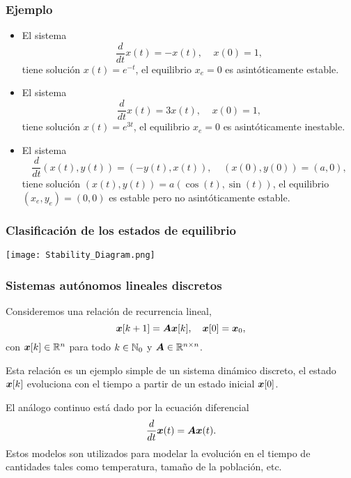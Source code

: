 \documentclass[aspectratio=169,12pt,spanish]{beamer}
\begin{document}

\begin{frame}
\frametitle{Ejemplo}
\begin{itemize}
\item El sistema
$$
\frac{d}{dt}{x(t)}  = -x(t),\;\;\;\;x(0) = 1,
$$
tiene solución $x(t) = e^{-t}$, el equilibrio $x_e = 0$ es asintóticamente estable.

\item El sistema
$$
\frac{d}{dt}{x(t)}  = 3x(t),\;\;\;\;x(0) = 1,
$$
tiene solución $x(t) = e^{3t}$, el equilibrio $x_e = 0$ es asintóticamente inestable.

\item El sistema
$$
\frac{d}{dt}{(x(t), y(t))}  = (-y(t), x(t)),\;\;\;\;(x(0), y(0)) = (a,0),
$$
tiene solución $(x(t), y(t)) = a(\cos(t), \sin(t))$, el equilibrio $(x_e, y_e) = (0,0)$ es estable pero no asintóticamente estable.

\end{itemize}

\end{frame}



\begin{frame}
\frametitle{Clasificación de los estados de equilibrio}

\begin{center}
\texttt{[image: Stability\_Diagram.png]}
\end{center}



\end{frame}




\begin{frame}
\frametitle{Sistemas autónomos lineales discretos}

Consideremos una relación de recurrencia lineal,
$$
\bm{x}[k+1] = \bm{A} \bm{x}[k], \quad \bm{x}[0] = \bm{x}_0,
$$
con $\bm{x}[k] \in \mathbb{R}^n$ para todo $k \in \mathbb{N}_0$ y $\bm{A} \in \mathbb{R}^{n \times n}$.

Esta relación es un ejemplo simple de un sistema dinámico discreto, el estado $\bm{x}[k]$ evoluciona con el tiempo a partir de un estado inicial $\bm{x}[0]$.

El análogo continuo está dado por la ecuación diferencial
$$
\frac{d}{dt}\bm{x}(t) = \bm{A}\bm{x}(t).
$$
Estos modelos son utilizados para modelar la evolución en el tiempo de cantidades tales como temperatura, tamaño de la población, etc.
\end{frame}
\end{document}
